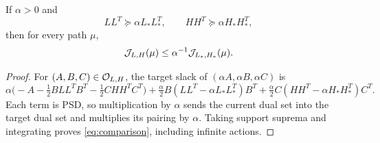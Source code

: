 \begin{lemma}\label{lem:comparison}
If $\alpha>0$ and
\begin{equation}\label{eq:relative}
 LL^T\succeq\alpha L_*L_*^T,
 \qquad HH^T\succeq\alpha H_*H_*^T,
\end{equation}
then for every path $\mu$,
\begin{equation}\label{eq:comparison}
 \mathcal J_{L,H}(\mu)\le\alpha^{-1}\mathcal J_{L_*,H_*}(\mu).
\end{equation}
\end{lemma}
\begin{proof}
For $(A,B,C)\in\mathcal O_{L,H}$, the target slack of
$(\alpha A,\alpha B,\alpha C)$ is
\[
 \alpha\bigl(-A-\tfrac12BLL^TB^T-\tfrac12CHH^TC^T\bigr)
 +\tfrac\alpha2 B(LL^T-\alpha L_*L_*^T)B^T
 +\tfrac\alpha2 C(HH^T-\alpha H_*H_*^T)C^T.
\]
Each term is PSD, so multiplication by $\alpha$ sends the current dual
set into the target dual set and multiplies its pairing by $\alpha$.
Taking support suprema and integrating proves \eqref{eq:comparison},
including infinite actions.
\end{proof}
